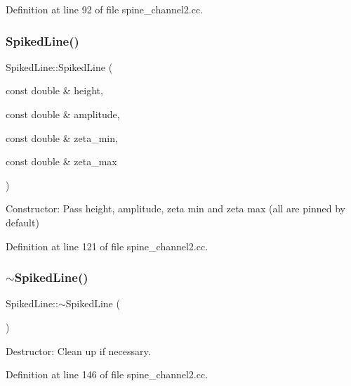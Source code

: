 Definition at line 92 of file spine\+\_\+channel2.\+cc.

\mbox{\label{classSpikedLine_ad007f4c54d091b1c4ddb4b63cef0e7b6}} 
\subsubsection{\texorpdfstring{Spiked\+Line()}{SpikedLine()}\hspace{0.1cm}{\footnotesize\ttfamily [2/2]}}
{\footnotesize\ttfamily Spiked\+Line\+::\+Spiked\+Line (\begin{DoxyParamCaption}\item[{const double \&}]{height,  }\item[{const double \&}]{amplitude,  }\item[{const double \&}]{zeta\+\_\+min,  }\item[{const double \&}]{zeta\+\_\+max }\end{DoxyParamCaption})\hspace{0.3cm}{\ttfamily [inline]}}



Constructor\+: Pass height, amplitude, zeta min and zeta max (all are pinned by default) 



Definition at line 121 of file spine\+\_\+channel2.\+cc.

\mbox{\label{classSpikedLine_a54f1b8a7951ad8205741e78fc75afaa3}} 
\subsubsection{\texorpdfstring{$\sim$\+Spiked\+Line()}{~SpikedLine()}}
{\footnotesize\ttfamily Spiked\+Line\+::$\sim$\+Spiked\+Line (\begin{DoxyParamCaption}{ }\end{DoxyParamCaption})\hspace{0.3cm}{\ttfamily [inline]}}



Destructor\+: Clean up if necessary. 



Definition at line 146 of file spine\+\_\+channel2.\+cc.



